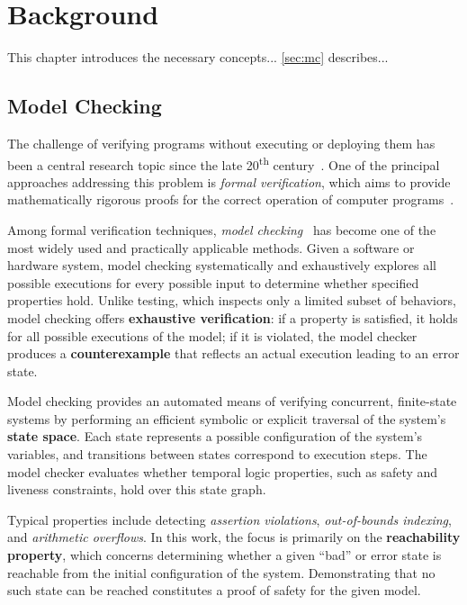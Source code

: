 \chapter{Background}

This chapter introduces the necessary concepts... %
\autoref{sec:mc} describes... %


\section{Model Checking}\label{sec:mc}

The challenge of verifying programs without executing or deploying them has been a central research topic since the late 20\textsuperscript{th} century~\cite{systemEngineering}. One of the principal approaches addressing this problem is \textit{formal verification}, which aims to provide mathematically rigorous proofs for the correct operation of computer programs~\cite{MC}.

Among formal verification techniques, \textit{model checking}~\cite{modelChecking, modelChecking2} has become one of the most widely used and practically applicable methods. Given a software or hardware system, model checking systematically and exhaustively explores all possible executions for every possible input to determine whether specified properties hold. %
 Unlike testing, which inspects only a limited subset of behaviors, model checking offers \textbf{exhaustive verification}: if a property is satisfied, it holds for all possible executions of the model; if it is violated, the model checker produces a \textbf{counterexample} that reflects an actual execution leading to an error state.

Model checking provides an automated means of verifying concurrent, finite-state systems by performing an efficient symbolic or explicit traversal of the system's \textbf{state space}. Each state represents a possible configuration of the system's variables, and transitions between states correspond to execution steps. The model checker evaluates whether temporal logic properties, such as safety and liveness constraints, hold over this state graph.

Typical properties include detecting \textit{assertion violations}, \textit{out-of-bounds indexing}, and \textit{arithmetic overflows}. In this work, the focus is primarily on the \textbf{reachability property}, which concerns determining whether a given “bad” or error state is reachable from the initial configuration of the system. Demonstrating that no such state can be reached constitutes a proof of safety for the given model.

